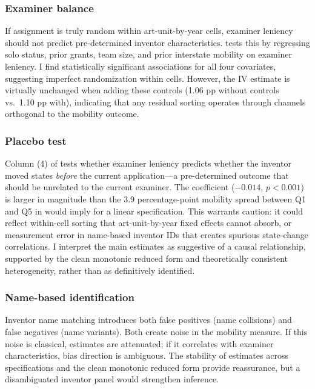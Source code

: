 \documentclass[12pt]{article}
\begin{document}
\subsubsection*{Examiner balance} If assignment is truly random within art-unit-by-year cells, examiner leniency should not predict pre-determined inventor characteristics.  tests this by regressing solo status, prior grants, team size, and prior interstate mobility on examiner leniency. I find statistically significant associations for all four covariates, suggesting imperfect randomization within cells. However, the IV estimate is virtually unchanged when adding these controls (1.06 pp without controls vs.\ 1.10 pp with), indicating that any residual sorting operates through channels orthogonal to the mobility outcome.

\subsubsection*{Placebo test} Column (4) of  tests whether examiner leniency predicts whether the inventor moved states \textit{before} the current application---a pre-determined outcome that should be unrelated to the current examiner. The coefficient ($-0.014$, $p < 0.001$) is larger in magnitude than the 3.9 percentage-point mobility spread between Q1 and Q5 in  would imply for a linear specification. This warrants caution: it could reflect within-cell sorting that art-unit-by-year fixed effects cannot absorb, or measurement error in name-based inventor IDs that creates spurious state-change correlations. I interpret the main estimates as suggestive of a causal relationship, supported by the clean monotonic reduced form and theoretically consistent heterogeneity, rather than as definitively identified.

\subsubsection*{Name-based identification} Inventor name matching introduces both false positives (name collisions) and false negatives (name variants). Both create noise in the mobility measure. If this noise is classical, estimates are attenuated; if it correlates with examiner characteristics, bias direction is ambiguous. The stability of estimates across specifications and the clean monotonic reduced form provide reassurance, but a disambiguated inventor panel would strengthen inference.
\end{document}

